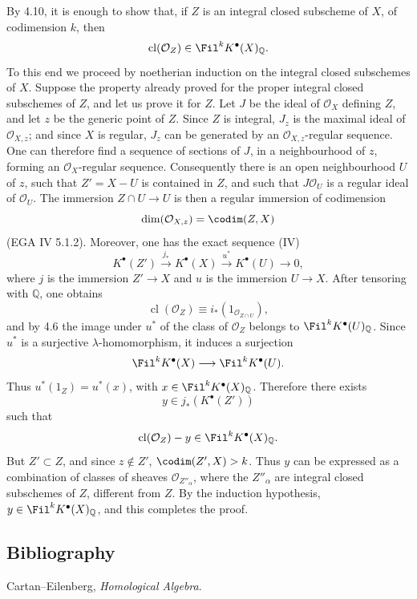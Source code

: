 By 4.10, it is enough to show that, if \(Z\) is an integral closed subscheme of \(X\), of codimension \(k\), then
\[
  \operatorname{cl}(\mathcal O_Z)\in\Fil^kK^\bullet(X)_{\mathbb Q}.
\]
To this end we proceed by noetherian induction on the integral closed subschemes of \(X\). Suppose the property already proved for the proper integral closed subschemes of \(Z\), and let us prove it for \(Z\). Let \(J\) be the ideal of \(\mathcal O_X\) defining \(Z\), and let \(z\) be the generic point of \(Z\). Since \(Z\) is integral, \(J_z\) is the maximal ideal of \(\mathcal O_{X,z}\); and since \(X\) is regular, \(J_z\) can be generated by an \(\mathcal O_{X,z}\)-regular sequence. One can therefore find a sequence of sections of \(J\), in a neighbourhood of \(z\), forming an \(\mathcal O_X\)-regular sequence. Consequently there is an open neighbourhood \(U\) of \(z\), such that \(Z'=X-U\) is contained in \(Z\), and such that \(J\mathcal O_U\) is a regular ideal of \(\mathcal O_U\). The immersion \(Z\cap U\to U\) is then a regular immersion of codimension
\[
  \dim(\mathcal O_{X,z})=\codim(Z,X)
\]
(EGA IV 5.1.2). Moreover, one has the exact sequence (IV)
\[
  K^\bullet(Z')\xrightarrow{j_*}K^\bullet(X)
  \xrightarrow{u^*}K^\bullet(U)\to0,
\]
where \(j\) is the immersion \(Z'\to X\) and \(u\) is the immersion \(U\to X\). After tensoring with \(\mathbb Q\), one obtains
\[
  \operatorname{cl}(\mathcal O_Z)
  \equiv i_*(1_{\mathcal O_{Z\cap U}}),
\]
and by 4.6 the image under \(u^*\) of the class of \(\mathcal O_Z\) belongs to \(\Fil^kK^\bullet(U)_{\mathbb Q}\). Since \(u^*\) is a surjective \(\lambda\)-homomorphism, it induces a surjection
\[
  \Fil^kK^\bullet(X)\longrightarrow \Fil^kK^\bullet(U).
\]
Thus \(u^*(1_Z)=u^*(x)\), with \(x\in\Fil^kK^\bullet(X)_{\mathbb Q}\). Therefore there exists
\[
  y\in j_*(K^\bullet(Z'))
\]
such that
\[
  \operatorname{cl}(\mathcal O_Z)-y\in\Fil^kK^\bullet(X)_{\mathbb Q}.
\]
But \(Z'\subset Z\), and since \(z\notin Z'\), \(\codim(Z',X)>k\). Thus \(y\) can be expressed as a combination of classes of sheaves \(\mathcal O_{Z''_\alpha}\), where the \(Z''_\alpha\) are integral closed subschemes of \(Z\), different from \(Z\). By the induction hypothesis, \(y\in\Fil^kK^\bullet(X)_{\mathbb Q}\), and this completes the proof.

\subsection*{Bibliography}
\begin{enumerate}[label={[\arabic*]}]
\item Cartan--Eilenberg, \emph{Homological Algebra}.
\end{enumerate}




